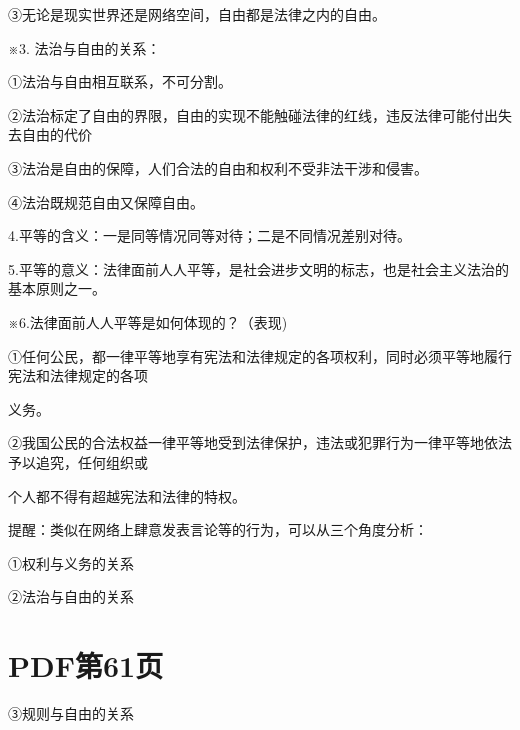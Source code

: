 \documentclass[lang=cn,11pt]{elegantbook}
\newcommand{\daofasym}[1]{{\daofasymbolfont #1}}
\newcommand{\daofasym}[1]{#1}
\begin{document}
\daofasym{③}无论是现实世界还是网络空间，自由都是法律之内的自由。\par

※3. 法治与自由的关系：\par

\daofasym{①}法治与自由相互联系，不可分割。\par

\daofasym{②}法治标定了自由的界限，自由的实现不能触碰法律的红线，违反法律可能付出失去自由的代价\par

\daofasym{③}法治是自由的保障，人们合法的自由和权利不受非法干涉和侵害。\par

\daofasym{④}法治既规范自由又保障自由。\par

4.平等的含义：一是同等情况同等对待；二是不同情况差别对待。\par

5.平等的意义：法律面前人人平等，是社会进步文明的标志，也是社会主义法治的基本原则之一。\par

※6.法律面前人人平等是如何体现的？（表现)\par

\daofasym{①}任何公民，都一律平等地享有宪法和法律规定的各项权利，同时必须平等地履行宪法和法律规定的各项\par

义务。\par

\daofasym{②}我国公民的合法权益一律平等地受到法律保护，违法或犯罪行为一律平等地依法予以追究，任何组织或\par

个人都不得有超越宪法和法律的特权。\par

提醒：类似在网络上肆意发表言论等的行为，可以从三个角度分析：\par

\daofasym{①}权利与义务的关系\par

\daofasym{②}法治与自由的关系\par


\section*{PDF第61页}

\daofasym{③}规则与自由的关系\par
\end{document}
